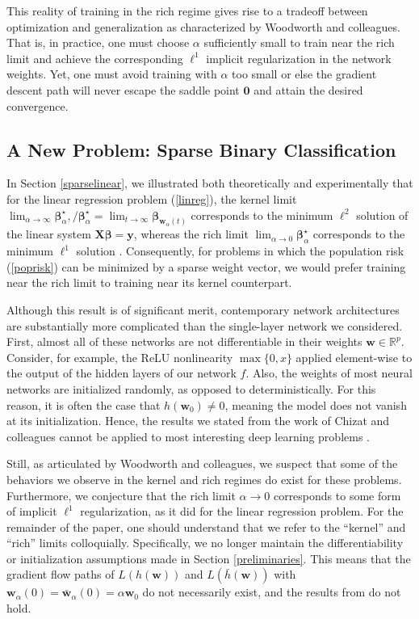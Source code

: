 \documentclass{article}
\begin{document}
This reality of training in the rich regime gives rise to a tradeoff between optimization and generalization as characterized by Woodworth and colleagues. That is, in practice, one must choose $\alpha$ sufficiently small to train near the rich limit and achieve the corresponding $\ell^1$ implicit regularization in the network weights. Yet, one must avoid training with $\alpha$ too small or else the gradient descent path will never escape the saddle point $\boldsymbol{0}$ and attain the desired convergence.

\subsection{A New Problem: Sparse Binary Classification}\label{sparselogistic}
In Section \ref{sparselinear}, we illustrated both theoretically and experimentally that for the linear regression problem (\ref{linreg}), the kernel limit $\lim_{\alpha \to \infty}\boldsymbol{\beta}_{\alpha}^{\star}, /  \boldsymbol{\beta}_{\alpha}^{\star} = \lim_{t \to \infty} \boldsymbol{\beta}_{\boldsymbol{w}_{\alpha}(t)}$ corresponds to the minimum $\ell^2$ solution of the linear system $\boldsymbol{X} \boldsymbol{\beta} = \boldsymbol{y}$, whereas the rich limit $\lim_{\alpha \to 0}\boldsymbol{\beta}_{\alpha}^{\star}$ corresponds to the minimum $\ell^1$ solution \cite{woodworth2020kernel}. Consequently, for problems in which the population risk (\ref{poprisk}) can be minimized by a sparse weight vector, we would prefer training near the rich limit to training near its kernel counterpart. 

Although this result is of significant merit, contemporary network architectures are substantially more complicated than the single-layer network we considered. First, almost all of these networks are not differentiable in their weights $\boldsymbol{w} \in \mathbb{R}^p$. Consider, for example, the ReLU nonlinearity $\max\{0, x \}$ applied element-wise to the output of the hidden layers of our network $f$. 
Also, the weights of most neural networks are initialized randomly, as opposed to deterministically. For this reason, it is often the case that $h(\boldsymbol{w}_0) \neq 0$, meaning the model does not vanish at its initialization. Hence, the results we stated from the work of Chizat and colleagues cannot be applied to most interesting deep learning problems \cite{chizat2018lazy}. 

Still, as articulated by Woodworth and colleagues, we suspect that some of the behaviors we observe in the kernel and rich regimes do exist for these problems. Furthermore, we conjecture that the rich limit $\alpha \rightarrow 0$ corresponds to some form of implicit $\ell^1$ regularization, as it did for the linear regression problem. For the remainder of the paper, one should understand that we refer to the \enquote{kernel} and \enquote{rich} limits colloquially. Specifically, we no longer maintain the differentiability or initialization assumptions made in Section \ref{preliminaries}. This means that the gradient flow paths of $L(h(\boldsymbol{w}))$ and $L(\bar{h}(\boldsymbol{w}))$ with $\boldsymbol{w}_{\alpha}(0) = \boldsymbol{\bar{w}}_{\alpha}(0) = \alpha \boldsymbol{w}_0$ do not necessarily exist, and the results from \cite{chizat2018lazy} do not hold.
\end{document}
